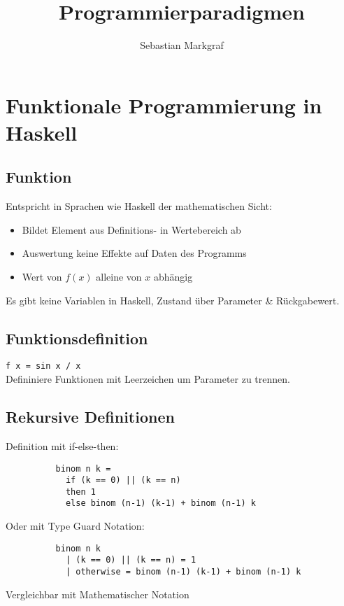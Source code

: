 \documentclass[10pt,a4paper]{article}
\author{Sebastian Markgraf}
\title{Programmierparadigmen}
\def\code#1{\texttt{#1}}
\begin{document}
	{\let\newpage\relax\maketitle}
	\tableofcontents
	\newpage
	\setcounter{page}{1}

        \section{Funktionale Programmierung in Haskell}

        \subsection{Funktion}
        Entspricht in Sprachen wie Haskell der mathematischen Sicht:
        \begin{itemize}
          \item Bildet Element aus Definitions- in Wertebereich ab
          \item Auswertung keine Effekte auf Daten des Programms
          \item Wert von \(f(x)\) alleine von \(x\) abhängig
        \end{itemize}
        Es gibt keine Variablen in Haskell, Zustand über Parameter \& Rückgabewert.  

        \subsection{Funktionsdefinition}
        \code{f x = sin x / x}\\
        Defininiere Funktionen mit Leerzeichen um Parameter zu trennen.\\

        
        \subsection{Rekursive Definitionen}
        Definition mit if-else-then:
        \begin{lstlisting}
          binom n k =
            if (k == 0) || (k == n)
            then 1
            else binom (n-1) (k-1) + binom (n-1) k
        \end{lstlisting}
        Oder mit Type Guard Notation:
        \begin{lstlisting}
          binom n k
            | (k == 0) || (k == n) = 1
            | otherwise = binom (n-1) (k-1) + binom (n-1) k
        \end{lstlisting}
        Vergleichbar mit Mathematischer Notation
\end{document}
